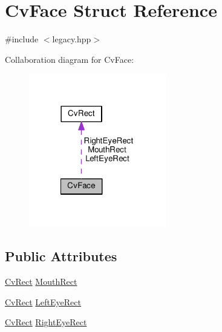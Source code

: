 \hypertarget{structCvFace}{\section{Cv\-Face Struct Reference}
\label{structCvFace}
}


{\ttfamily \#include $<$legacy.\-hpp$>$}



Collaboration diagram for Cv\-Face\-:\nopagebreak
\begin{figure}[H]
\begin{center}
\leavevmode
\includegraphics[width=170pt]{structCvFace__coll__graph}
\end{center}
\end{figure}
\subsection*{Public Attributes}
\begin{DoxyCompactItemize}
\item 
\hyperlink{structCvRect}{Cv\-Rect} \hyperlink{structCvFace_af9e59f64d8b4ff74be6481ee4a6eda0b}{Mouth\-Rect}
\item 
\hyperlink{structCvRect}{Cv\-Rect} \hyperlink{structCvFace_a1552b64b4ff72137d3b3a3f31d87c315}{Left\-Eye\-Rect}
\item 
\hyperlink{structCvRect}{Cv\-Rect} \hyperlink{structCvFace_ae39fc3ffa37e59363fc3c2bf81d80b06}{Right\-Eye\-Rect}
\end{DoxyCompactItemize}


